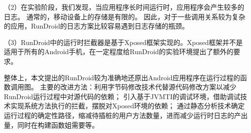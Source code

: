 （2）在实验阶段，我们发现，当应用程序长时间运行时，应用程序会产生较多的日志。
通常的，移动设备上的存储是有限的。
因此，对于一些调用关系较为复杂的应用，RunDroid的日志方案比较容易遇到日志存储的瓶颈。

（3）RunDroid中的运行时拦截器是基于Xposed框架实现的。Xposed框架并不是适用于所有的Android手机，在一定程度给RunDroid的实验环境提出了额外的要求。

整体上，本文提出的RunDroid较为准确地还原出Android应用程序在运行过程的函数调用图。
主要的改进方法：利用字节码修改技术代替源代码修改方案以减少RunDroid运行过程中对源代码的依赖；
引入基于JVMTI的调试环境，借助调试技术实现系统方法执行的拦截，摆脱对Xposed环境的依赖；
通过静态分析技术确定运行过程的确定性路径，缩减待插桩的用户方法数量，进而减少运行时日志的产出量，同时在构建函数姐需要等。